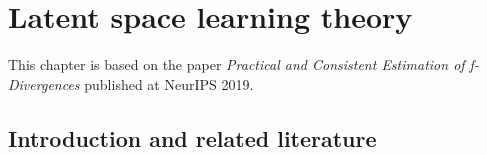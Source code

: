\chapter{Latent space learning theory}

\ifpdf
    \graphicspath{{Chapter6/Figs/Raster/}{Chapter6/Figs/PDF/}{Chapter6/Figs/}}
\else
    \graphicspath{{Chapter6/Figs/Vector/}{Chapter6/Figs/}}
\fi

This chapter is based on the paper \emph{Practical and Consistent Estimation of f-Divergences} published at NeurIPS 2019.




\section{Introduction and related literature}\label{sec:intro}

